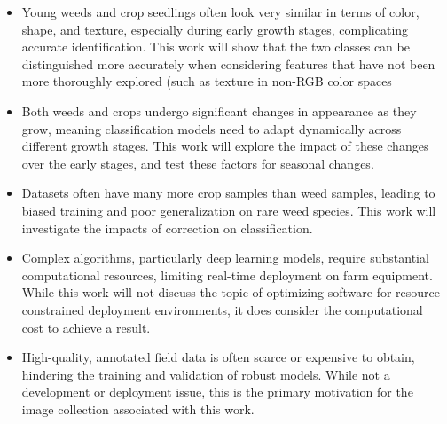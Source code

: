 \documentclass[letterpaper]{report}
\begin{document}
\begin{itemize}

\item{Young weeds and crop seedlings often look very similar in terms of color, shape, and texture, especially during early growth stages, complicating accurate identification. This work will show that the two classes can be distinguished more accurately when considering features that have not been more thoroughly explored (such as texture in non-RGB color spaces}

\item{Both weeds and crops undergo significant changes in appearance as they grow, meaning classification models need to adapt dynamically across different growth stages. This work will explore the impact of these changes over the early stages, and test these factors for seasonal changes.}

\item{Datasets often have many more crop samples than weed samples, leading to biased training and poor generalization on rare weed species. This work will investigate the impacts of correction on classification.}

\item{Complex algorithms, particularly deep learning models, require substantial computational resources, limiting real-time deployment on farm equipment. While this work will not discuss the topic of optimizing software for resource constrained deployment environments, it does consider the computational cost to achieve a result.}

\item{High-quality, annotated field data is often scarce or expensive to obtain, hindering the training and validation of robust models. While not a development or deployment issue, this is the primary motivation for the image collection associated with this work.}

\end{itemize}
\end{document}
